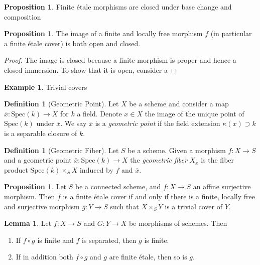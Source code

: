 \documentclass{article}
\theoremstyle{definition}
\newtheorem{lemma}[theorem]{Lemma}
\newtheorem{proposition}[theorem]{Proposition}
\newtheorem{definition}[theorem]{Definition}
\newtheorem{example}[theorem]{Example}
\theoremstyle{remark}
\begin{document}
\begin{proposition}
Finite \'etale morphisms are closed under base change and composition
\end{proposition}

\begin{proposition}
	The image of a finite and locally free morphism $f$ (in particular a finite \'etale cover) is both open and closed.
\end{proposition}

\begin{proof}
	The image is closed because a finite morphism is proper and hence a closed immersion.
	To show that it is open, consider a
\end{proof}

\begin{example}
	Trivial covers
\end{example}

\begin{definition}[Geometric Point]
	Let $X$ be a scheme and consider a map $\overline{x}: \text{Spec}(k) \to X$ for $k$ a field.
	Denote $x \in X$ the image of the unique point of $\text{Spec}(k)$ under $\overline{x}$.
	We say $\overline{x}$ is a \textit{geometric point} if the field extension $\kappa(x) \supset k$ is a separable closure of $k$.
\end{definition}

\begin{definition}[Geometric Fiber]
	Let $S$ be a scheme. 
	Given a morphism $f: X \to S$ and a geometric point $\overline{x}: \text{Spec}(k) \to X$ the \textit{geometric fiber} $X_{\overline{x}}$ is the fiber product $\text{Spec}(k) \times_S X$ induced by $f$ and $\overline{x}$.
\end{definition}


\begin{proposition}
	Let $S$ be a connected scheme, and $f\colon X \to S$ an affine surjective morphism.
	Then $f$ is a finite \'etale cover if and only if there is a finite, locally free and surjective morphism $g: Y \to S$ such that $X \times_S Y$ is a trivial cover of $Y$.
\end{proposition}

\begin{lemma}
	Let $f\colon X \to S$ and $G: Y \to X$ be morphisms of schemes. 
	Then 
	\begin{enumerate}
		\item If $f \circ g$ is finite and $f$ is separated, then $g$ is finite.
		\item If in addition both $f \circ g$ and $g$ are finite \'etale, then so is $g$.
	\end{enumerate}
	
\end{lemma}
\end{document}
